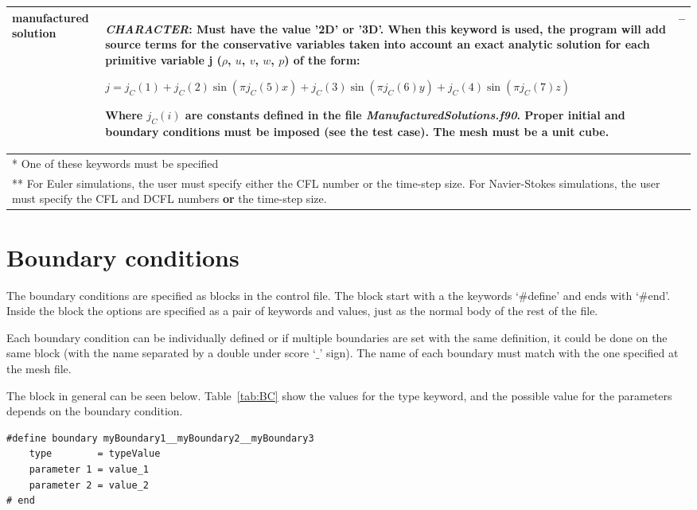 \documentclass[a4paper,10pt]{report}
\begin{document}
\begin{longtable}{|p{4cm}|p{10cm}|p{2.2cm}|}
manufactured solution & \textit{CHARACTER}: Must have the value '2D' or '3D'. When this keyword is used, the program will add source terms for the conservative variables taken into account an exact analytic solution for each primitive variable j ($\rho$, $u$, $v$, $w$, $p$) of the form:\

$j = j_C(1) + j_C(2) \sin(\pi j_C(5) x) + j_C(3) \sin(\pi j_C(6) y) + j_C(4) \sin(\pi j_C(7) z) $\

Where $j_C(i)$ are constants defined in the file \textit{ManufacturedSolutions.f90}. Proper initial and boundary conditions must be imposed (see the test case). The mesh must be a unit cube.
  & -- \\ \hline

\multicolumn{3}{p{16.4cm}}{*  One of these keywords must be specified} \\

\multicolumn{3}{p{16.4cm}}{** For Euler simulations, the user must specify either the CFL number or the time-step size. For Navier-Stokes simulations, the user must specify the CFL and DCFL numbers \textbf{or} the time-step size.}

\end{longtable}

\section{Boundary conditions}

The boundary conditions are specified as blocks in the control file. The block start with a the keywords `\#define' and ends with `\#end'. Inside the block the options are specified as a pair of keywords and values, just as the normal body of the rest of the file.

Each boundary condition can be individually defined or if multiple boundaries are set with the same definition, it could be done on the same block (with the name separated by a double under score `$\_$' sign). The name of each boundary must match with the one specified at the mesh file.

The block in general can be seen below. Table~\ref{tab:BC} show the values for the type keyword, and the possible value for the parameters depends on the boundary condition.

\begin{lstlisting}
#define boundary myBoundary1__myBoundary2__myBoundary3
	type        = typeValue
	parameter 1 = value_1
	parameter 2 = value_2
# end
\end{lstlisting}
\end{document}

